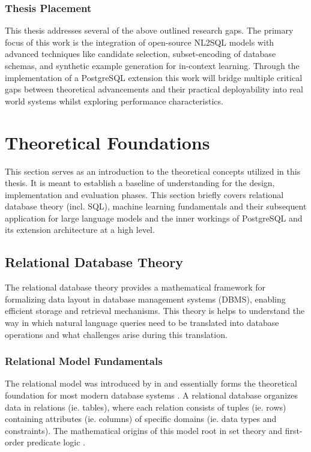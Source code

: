 \documentclass{article}
\begin{document}
\subsubsection{Thesis Placement}

This thesis addresses several of the above outlined research gaps. The primary focus of this work is the integration of open-source
NL2SQL models with advanced techniques like candidate selection, subset-encoding of database schemas, and synthetic example 
generation for in-context learning. Through the implementation of a PostgreSQL extension this work will bridge multiple critical 
gaps between theoretical advancements and their practical deployability into real world systems whilst exploring performance 
characteristics. 

\newpage

\section{Theoretical Foundations}

This section serves as an introduction to the theoretical concepts utilized in this thesis. It is meant to establish a
baseline of understanding for the design, implementation and evaluation phases. This section briefly covers relational
database theory (incl. SQL), machine learning fundamentals and their subsequent application for large language models
and the inner workings of PostgreSQL and its extension architecture at a high level.

\subsection{Relational Database Theory}

The relational database theory provides a mathematical framework for formalizing data layout in database management
systems (DBMS), enabling efficient storage and retrieval mechanisms. This theory is helps to understand the way in
which natural language queries need to be translated into database operations and what challenges arise during this
translation.

\subsubsection{Relational Model Fundamentals}

The relational model was introduced by \citeauthor{RelationalModel} in \citeyear{RelationalModel} and essentially forms
the theoretical foundation for most modern database systems \citep{RelationalModel, Rendezvous}. A relational database
organizes data in relations (ie. tables), where each relation consists of tuples (ie. rows) containing attributes
(ie. columns) of specific domains (ie. data types and constraints). The mathematical origins of this model root in
set theory and first-order predicate logic \citep{RelationalModel, DatabaseSystemIntro}.
\end{document}
